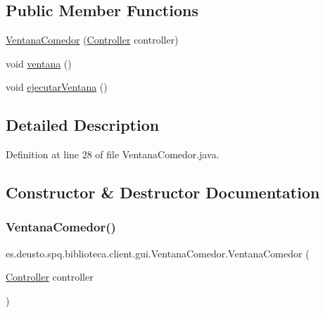 \subsection*{Public Member Functions}
\begin{DoxyCompactItemize}
\item 
\mbox{\hyperlink{classes_1_1deusto_1_1spq_1_1biblioteca_1_1client_1_1gui_1_1_ventana_comedor_aca539744e7216aefab50a56a6e6d28c7}{Ventana\+Comedor}} (\mbox{\hyperlink{classes_1_1deusto_1_1spq_1_1biblioteca_1_1controller_1_1_controller}{Controller}} controller)
\item 
void \mbox{\hyperlink{classes_1_1deusto_1_1spq_1_1biblioteca_1_1client_1_1gui_1_1_ventana_comedor_a5fccdea48f9951fe483c0ace7ef475e0}{ventana}} ()
\item 
void \mbox{\hyperlink{classes_1_1deusto_1_1spq_1_1biblioteca_1_1client_1_1gui_1_1_ventana_comedor_afd75ec87658a9f0ebb4a77e48de601f8}{ejecutar\+Ventana}} ()
\end{DoxyCompactItemize}


\subsection{Detailed Description}


Definition at line 28 of file Ventana\+Comedor.\+java.



\subsection{Constructor \& Destructor Documentation}
\mbox{\label{classes_1_1deusto_1_1spq_1_1biblioteca_1_1client_1_1gui_1_1_ventana_comedor_aca539744e7216aefab50a56a6e6d28c7}} 
\subsubsection{\texorpdfstring{Ventana\+Comedor()}{VentanaComedor()}}
{\footnotesize\ttfamily es.\+deusto.\+spq.\+biblioteca.\+client.\+gui.\+Ventana\+Comedor.\+Ventana\+Comedor (\begin{DoxyParamCaption}\item[{\mbox{\hyperlink{classes_1_1deusto_1_1spq_1_1biblioteca_1_1controller_1_1_controller}{Controller}}}]{controller }\end{DoxyParamCaption})}

